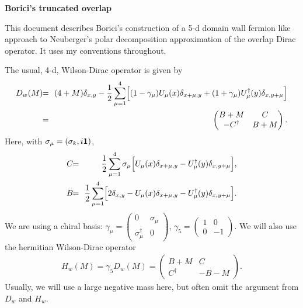 \documentclass[12pt]{article}
\begin{document}
\newcommand{\half}{\frac{1}{2}}
\newcommand{\be}{\begin{displaymath}}
\newcommand{\ee}{\end{displaymath}}
\newcommand{\bea}{\begin{eqnarray}}
\newcommand{\eea}{\end{eqnarray}}
\newcommand{\bdm}{\begin{displaymath}}
\newcommand{\edm}{\end{displaymath}}
\newcommand{\<}{\langle}
\renewcommand{\>}{\rangle}
\newcommand{\Tr}{\mbox{Tr}}

\centerline{\bf \Large Borici's truncated overlap}
\vskip 5mm

This document describes Borici's construction of a 5-d domain wall fermion
like approach to Neuberger's polar decomposition approximation of the
overlap Dirac operator. It uses my conventions throughout.

The usual, 4-d, Wilson-Dirac operator is given by
\bea
D_w(M) \!\! &=& \!\! (4+M) \delta_{x,y} - \frac{1}{2} \sum_{\mu=1}^4 \Bigl[
 (1 - \gamma_\mu) U_\mu(x) \delta_{x+\mu,y} +
 (1 + \gamma_\mu) U_\mu^\dagger(y) \delta_{x,y+\mu} \Bigr] \nonumber \\
\!\! &=& \!\! \begin{pmatrix} B + M & C \\ -C^\dagger & B + M \end{pmatrix} .
\label{eq:D_w}
\eea
Here, with $\sigma_\mu = (\sigma_k, i {\bf 1})$,
\bea
C \!\! &=& \!\! \frac{1}{2} \sum_{\mu=1}^4 \sigma_\mu \Bigl[ U_\mu(x)
 \delta_{x+\mu,y} - U_\mu^\dagger(y) \delta_{x,y+\mu} \Bigr] , \nonumber \\
B \!\! &=& \!\! \frac{1}{2} \sum_{\mu=1}^4 \Bigl[ 2 \delta_{x,y} -  U_\mu(x)
 \delta_{x+\mu,y} - U_\mu^\dagger(y) \delta_{x,y+\mu} \Bigr] .
\label{eq:C_B}
\eea
We are using a chiral basis: $\gamma_\mu = \begin{pmatrix} 0 & \sigma_\mu \\
\sigma_\mu^\dagger & 0 \end{pmatrix}$, $\gamma_5 = \begin{pmatrix} 1 & 0 \\
0 & -1 \end{pmatrix}$. We will also use the hermitian Wilson-Dirac operator
\bea
H_w(M) = \gamma_5 D_w(M) = \begin{pmatrix} B + M & C \\
	C^\dagger & -B - M \end{pmatrix} .
\label{eq:H_w}
\eea
Usually, we will use a large negative mass here, but often omit the
argument from $D_w$ and $H_w$.
\end{document}
